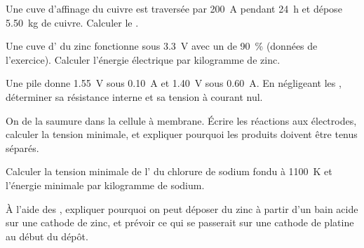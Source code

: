 \begin{exercise}[$\star\star$]\label{exo:b2:batteries-electrolysis:5}
Une cuve d'affinage du cuivre est traversée par \qty{200}{A} pendant \qty{24}{h} et dépose
\qty{5.50}{kg} de cuivre. Calculer le .
\end{exercise}

\begin{exercise}[$\star\star$]\label{exo:b2:batteries-electrolysis:6}
Une cuve d' du zinc fonctionne sous \qty{3.3}{V} avec un  de
90~\% (données de l'exercice). Calculer l'énergie électrique par kilogramme de zinc.
\end{exercise}

\begin{exercise}[$\star\star$]\label{exo:b2:batteries-electrolysis:7}
Une pile donne \qty{1.55}{V} sous \qty{0.10}{A} et \qty{1.40}{V} sous \qty{0.60}{A}.
En négligeant les , déterminer sa résistance interne et sa
tension à courant nul.
\end{exercise}

\begin{exercise}[$\star\star$]\label{exo:b2:batteries-electrolysis:8}
On  de la saumure dans la cellule à membrane. Écrire les réactions aux électrodes,
calculer la tension minimale, et expliquer pourquoi les produits doivent être tenus
séparés.
\end{exercise}

\begin{exercise}[$\star\star$]\label{exo:b2:batteries-electrolysis:9}
Calculer la tension minimale de l' du chlorure de sodium fondu à
\qty{1100}{K} et l'énergie minimale par kilogramme de sodium.
\end{exercise}

\begin{exercise}[$\star\star\star$]\label{exo:b2:batteries-electrolysis:10}
À l'aide des , expliquer pourquoi on peut déposer du zinc à partir d'un
bain acide sur une cathode de zinc, et prévoir ce qui se passerait sur une cathode de platine au
début du dépôt.
\end{exercise}

